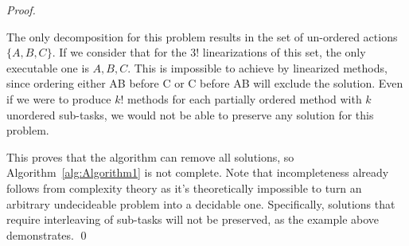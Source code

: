 \documentclass[runningheads]{llncs}
\begin{document}
\begin{proof}
\begin{figure}
{\begin{subfigure}{7cm}
		\end{subfigure}	
		}
	\end{figure}

	\begin{figure}
	\end{figure}

	The only decomposition for this problem results in the set of un-ordered actions $\{A, B, C\}$.
	If we consider that for the $3!$ linearizations of this set, the only executable one is $A, B, C$. This is impossible to achieve by linearized methods, since ordering either AB before C or C before AB will exclude the solution. 
	Even if we were to produce $k!$ methods for each partially ordered method with $k$ unordered sub-tasks, we would not be able to preserve any solution for this problem.
	
	This proves that the algorithm can remove all solutions, so Algorithm~\ref{alg:Algorithm1} is not complete. Note that incompleteness already follows from complexity theory as it's theoretically impossible to turn an arbitrary undecideable problem into a decidable one.
	Specifically, solutions that require interleaving of sub-tasks will not be preserved, as the example above demonstrates.
	\qed
\end{proof}
\end{document}
